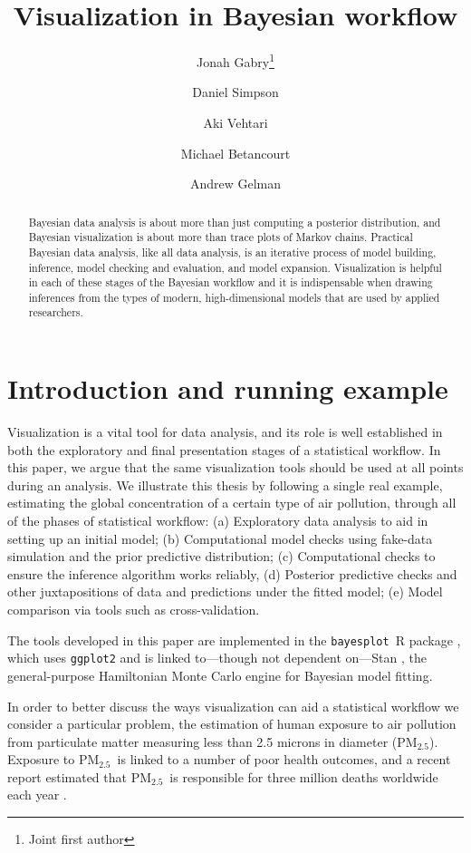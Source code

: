 \documentclass{statsoc}
\title{Visualization in Bayesian workflow}
\author[Gabry {\it et al.}]{Jonah Gabry\footnote{Joint first author}}
\author[Gabry {\it et al.}]{Daniel Simpson\footnotemark[1]}
\author[Gabry {\it et al.}]{Aki Vehtari}
\author[Gabry {\it et al.}]{Michael Betancourt}
\author[Gabry {\it et al.}]{Andrew Gelman}
\newcommand{\PM}{PM$_{2.5}$}
\newcommand{\bayesplot}{{\tt bayesplot}}
\begin{document}
\maketitle

\begin{abstract}
Bayesian data analysis is about more than just computing a posterior
distribution, and Bayesian visualization is about more than trace plots of
Markov chains. Practical Bayesian data analysis, like all data analysis, is an
iterative process of model building, inference, model checking and evaluation,
and model expansion. Visualization is helpful in each of these stages of the
Bayesian workflow and it is indispensable when drawing inferences from the types
of  modern, high-dimensional models that are used by applied researchers.
\end{abstract}


\section{Introduction and running example}
\label{sec:intro}

Visualization is a vital tool for data analysis, and its role is
well established in both the exploratory and final presentation stages of a
statistical workflow. In this paper, we argue that the same visualization tools
should be used at all points during an analysis.  We illustrate this thesis by
following a single real example, estimating the global concentration of a
certain type of air pollution, through all of the phases of statistical
workflow:
(a) Exploratory data analysis to aid in setting up an initial model;
(b) Computational model checks using fake-data simulation and the prior
      predictive distribution;
(c) Computational checks to ensure the inference algorithm works reliably,
(d) Posterior predictive checks and other juxtapositions of data and predictions
      under the fitted model;
(e)  Model comparison via tools such as cross-validation.

The tools developed in this paper are implemented in the \bayesplot\ R package
\citep{bayesplotRpackage, rcore}, which uses {\tt ggplot2} \citep{ggplot2Rpackage}
and is linked to---though not dependent on---Stan \citep{rstan,stanmanual},
the general-purpose Hamiltonian Monte Carlo engine for Bayesian model fitting.

In order to better discuss the ways visualization can aid a statistical
workflow we consider a particular problem, the estimation of human exposure to
air pollution from particulate matter measuring less than 2.5 microns in
diameter (\PM). Exposure to \PM\ is linked to a number of poor health outcomes,
and a recent report estimated that \PM\ is responsible for three million deaths
worldwide each year \citep{shaddick2017data}.
\end{document}
